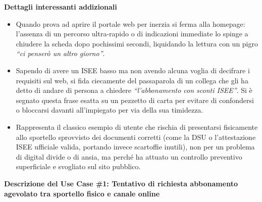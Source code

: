 ﻿\documentclass[11pt,a4paper]{article}
\begin{document}
\vspace{0.3cm}


\begin{tcolorbox}[base,colback=backgroundColor!50]
    \textbf{Dettagli interessanti addizionali} \\[4pt]
    {\small
    \begin{itemize}[leftmargin=*]
        \item Quando prova ad aprire il portale web per inerzia si ferma alla homepage: l'assenza di un percorso ultra-rapido o di indicazioni immediate lo spinge a chiudere la scheda dopo pochissimi secondi, liquidando la lettura con un pigro \textit{``ci penserò un altro giorno''}.
        \item Sapendo di avere un ISEE basso ma non avendo alcuna voglia di decifrare i requisiti sul web, si fida ciecamente del passaparola di un collega che gli ha detto di andare di persona a chiedere \textit{``l'abbonamento con sconti ISEE''}. Si è segnato questa frase esatta su un pezzetto di carta per evitare di confondersi o bloccarsi davanti all'impiegato per via della sua timidezza.
        \item Rappresenta il classico esempio di utente che rischia di presentarsi fisicamente allo sportello sprovvisto dei documenti corretti (come la DSU o l'attestazione ISEE ufficiale valida, portando invece scartoffie inutili), non per un problema di digital divide o di ansia, ma perché ha attuato un controllo preventivo superficiale e svogliato sul sito pubblico.
    \end{itemize}
    }
\end{tcolorbox}

\begin{tcolorbox}[sectionbox,colback=primaryColor!10]
    \textbf{Descrizione del Use Case \#1: Tentativo di richiesta abbonamento agevolato tra sportello fisico e canale online}
\end{tcolorbox}

\vspace{0.3cm}
\end{document}
